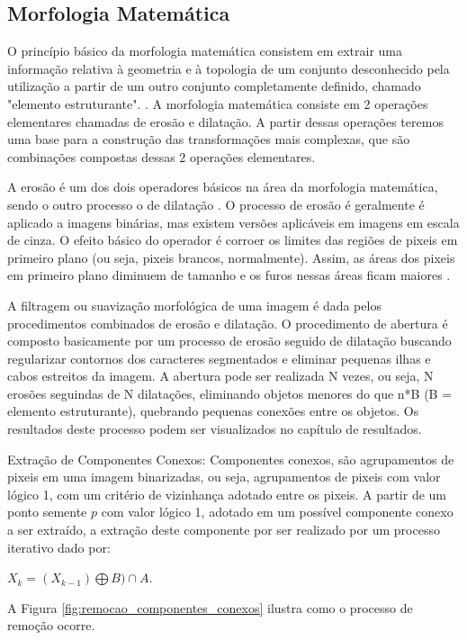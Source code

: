 \documentclass[
	12pt,				%
    oneside,			%
	a4paper,			%
	english,			%
	french,				%
	spanish,			%
	brazil,				%
	]{abntex2}
\begin{document}
\subsection{Morfologia Matemática}

O princípio básico da morfologia matemática consistem em extrair uma informação relativa à geometria e à topologia de um conjunto desconhecido pela utilização a partir de um outro conjunto completamente definido, chamado "elemento estruturante". \cite{Gil:02}. A morfologia matemática consiste em 2 operações elementares chamadas de erosão e dilatação. A partir dessas operações teremos uma base para a construção das transformações mais complexas, que são combinações compostas dessas 2 operações elementares.

A erosão é um dos dois operadores básicos na área da morfologia matemática, sendo o outro processo o de dilatação \cite{gonzalez1991}. O processo de erosão é geralmente é aplicado a imagens binárias, mas existem versões aplicáveis em imagens em escala de cinza. O efeito básico do operador é corroer os limites das regiões de pixeis em primeiro plano (ou seja, pixeis brancos, normalmente). Assim, as áreas dos pixeis em primeiro plano diminuem de tamanho e os furos nessas áreas ficam maiores \cite{gonzalez1991}.


A filtragem ou suavização morfológica de uma imagem é dada pelos procedimentos combinados de erosão e dilatação. O procedimento de abertura é composto basicamente por um processo de erosão seguido de dilatação buscando regularizar contornos dos caracteres segmentados e eliminar pequenas ilhas e cabos estreitos da imagem. A abertura pode ser realizada N vezes, ou seja, N erosões seguindas de N dilatações, eliminando objetos menores do que n*B (B = elemento estruturante), quebrando pequenas conexões entre os objetos. Os resultados deste processo podem ser visualizados no capítulo de resultados.

Extração de Componentes Conexos:
Componentes conexos, são agrupamentos de pixeis em uma imagem binarizadas, ou seja, agrupamentos de pixeis com valor lógico 1, com um critério de vizinhança adotado entre os pixeis. A partir de um ponto semente $p$ com valor lógico 1, adotado em um possível componente conexo a ser extraído, a extração deste componente por ser realizado por um processo iterativo dado por:

$X_k = (X_{k-1}) \bigoplus B) \cap A$.

A Figura \ref{fig:remocao_componentes_conexos} ilustra como o processo de remoção ocorre.
\end{document}

